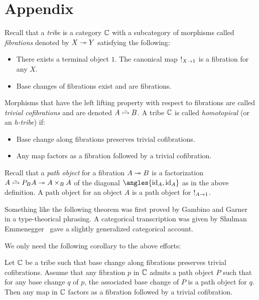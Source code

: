 \documentclass[reqno,10pt,a4paper,oneside]{amsart}
\begin{document}
\section{Appendix}

Recall that a \emph{tribe} is a category $\mathbb{C}$ with a subcategory of morphisms called \emph{fibrations} denoted by $X \twoheadrightarrow Y$ satisfying the following:
\begin{itemize}
\item
There exists a terminal object $1$.
The canonical map $\mathord{!}_{X \to 1}$ is a fibration for any $X$.
\item
Base changes of fibrations exist and are fibrations.
\end{itemize}

Morphisms that have the left lifting property with respect to fibrations are called \emph{trivial cofibrations} and are denoted $A \acof B$.
A tribe $\mathbb{C}$ is called \emph{homotopical} (or an \emph{h-tribe}) if:
\begin{itemize}
\item
Base change along fibrations preserves trivial cofibrations.
\item
Any map factors as a fibration followed by a trivial cofibration.
\end{itemize}

Recall that a \emph{path object} for a fibration $A \twoheadrightarrow B$ is a factorization $A \acof P_B A \fib A \times_B A$ of the diagonal $\angles{\id_A, \id_A}$ as in the above definition.
A path object for an object $A$ is a path object for $\mathord{!}_{A \to 1}$.

Something like the following theorem was first proved by Gambino and Garner~\cite{gambino-garner:idtypewfs} in a type-theorical phrasing.
A categorical transcription was given by Shulman~\cite[Lemma~2.4]{shulman:inverse-diagrams} 
Emmenegger~\cite{emmenegger:stable-path-objects-wfs} gave a slightly generalized categorical account.

We only need the following corollary to the above efforts:

\begin{theorem}
\label{wfs-from-path-objects}
Let $\mathbb{C}$ be a tribe such that base change along fibrations preserves trivial cofibrations.
Assume that any fibration $p$ in $\mathbb{C}$ admits a path object $P$ such that for any base change $q$ of $p$, the associated base change of $P$ is a path object for $q$.
Then any map in $\mathbb{C}$ factors as a fibration followed by a trivial cofibration.
\end{theorem}
\end{document}
